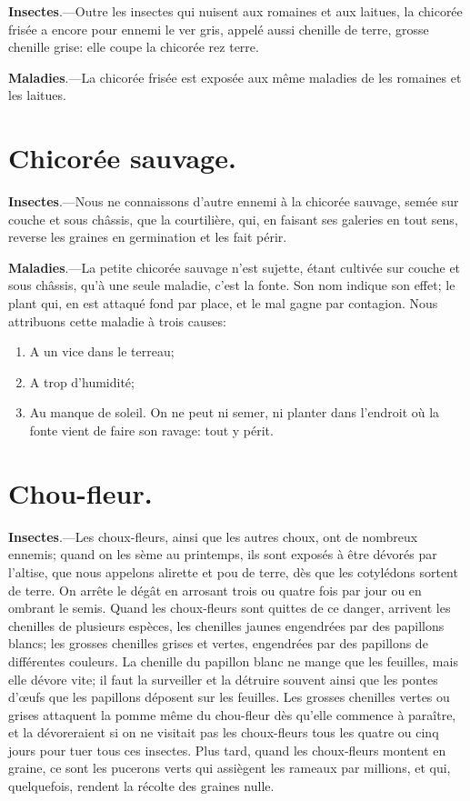 \documentclass[10pt,a4paper]{book}
\begin{document}
\textbf{Insectes}.---Outre les insectes qui nuisent aux romaines et aux laitues, la chicorée frisée a encore pour ennemi le ver gris, appelé aussi chenille de terre, grosse chenille grise: elle coupe la chicorée rez terre.

\textbf{Maladies}.---La chicorée frisée est exposée aux même maladies de les romaines et les laitues.

\section{Chicorée sauvage.}

\textbf{Insectes}.---Nous ne connaissons d'autre ennemi à la chicorée sauvage, semée sur couche et sous châssis, que la courtilière, qui, en faisant ses galeries en tout sens, reverse les graines en germination et les fait périr.

\textbf{Maladies}.---La petite chicorée sauvage n'est sujette, étant cultivée sur couche et sous châssis, qu'à une seule maladie, c'est la fonte. Son nom indique son effet; le plant qui, en est attaqué fond par place, et le mal gagne par contagion. Nous attribuons cette maladie à trois causes:
\begin{enumerate}
\item A un vice dans le terreau;
\item A trop d'humidité;
\item Au manque de soleil. On ne peut ni semer, ni planter dans l'endroit où la fonte vient de faire son ravage: tout y périt.
\end{enumerate}

\section{Chou-fleur.}

\textbf{Insectes}.---Les choux-fleurs, ainsi que les autres choux, ont de nombreux ennemis; quand on les sème au printemps, ils sont exposés à être dévorés par l'altise, que nous appelons alirette et pou de terre, dès que les cotylédons sortent de terre. On arrête le dégât en arrosant trois ou quatre fois par jour ou en ombrant le semis. Quand les choux-fleurs sont quittes de ce danger, arrivent les chenilles de plusieurs espèces, les chenilles jaunes engendrées par des papillons blancs; les grosses chenilles grises et vertes, engendrées par des papillons de différentes couleurs. La chenille du papillon blanc ne mange que les feuilles, mais elle dévore vite; il faut la surveiller et la détruire souvent ainsi que les pontes d'œufs que les papillons déposent sur les feuilles. Les grosses chenilles vertes ou grises attaquent la pomme même du chou-fleur dès qu'elle commence à paraître, et la dévoreraient si on ne visitait pas les choux-fleurs tous les quatre ou cinq jours pour tuer tous ces insectes. Plus tard, quand les choux-fleurs montent en graine, ce sont les pucerons verts qui assiègent les rameaux par millions, et qui, quelquefois, rendent la récolte des graines nulle.
\end{document}
